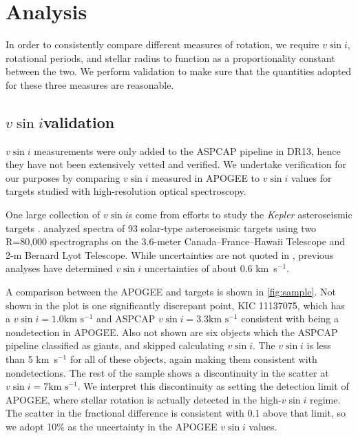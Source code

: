 \documentclass[manuscript]{aastex6}
\newcommand{\vsini}{\ensuremath{v \sin i}}
\newcommand{\Kepler}{\mbox{\textit{Kepler}}}
\newcommand{\kms}{\textrm{km~s}\ensuremath{^{-1}}}
\begin{document}
\section{Analysis}
\label{sec:analysis}

In order to consistently compare different measures of rotation, we require 
\vsini{}, rotational periods, and stellar radius to function as a 
proportionality constant
between the two. We perform validation to make sure that the quantities adopted
for these three measures are reasonable.


\subsection{\vsini validation}

\vsini{} measurements were only added to the ASPCAP pipeline in DR13, hence
they have not been extensively vetted and verified. We undertake 
verification for our purposes by comparing \vsini{} measured in APOGEE to \vsini{} values for
targets studied with high-resolution optical spectroscopy. 

One large collection of \vsini{}s come from efforts to study the
\Kepler{} asteroseismic targets \citep{Bruntt12}. \citet{Bruntt12} analyzed 
spectra of 93 solar-type asteroseismic targets using two R=80,000 spectrographs 
on the 3.6-meter Canada--France--Hawaii Telescope and 2-m Bernard Lyot
Telescope. While uncertainties are not quoted in \citet{Bruntt12},
previous analyses have determined \vsini{} uncertainties of about 0.6
\kms \citep{Bruntt10a,Bruntt10b}.

A comparison between the APOGEE and \citet{Bruntt12} targets is shown in
\cref{fig:sample}. Not shown in the plot is one significantly discrepant point, 
KIC 11137075, which has a \citet{Bruntt12}
\(\vsini = 1.0 \kms\) and ASPCAP \(\vsini = 3.3 \kms\) consistent with being a
nondetection in APOGEE. Also not shown are six
objects which the ASPCAP pipeline classified as giants, and skipped calculating
\vsini{}. The \citet{Bruntt12} \vsini{} is less than 5
\kms{} for all of these objects, again making them consistent with nondetections.
The rest of the sample shows a discontinuity in the scatter at \citet{Bruntt12} 
\(\vsini=7\kms\). We interpret this discontinuity as setting the detection limit 
of APOGEE, where stellar rotation is actually detected in the high-\vsini{} 
regime.  The scatter in the fractional difference is consistent with 0.1 above that
limit, so we adopt 10\% as the uncertainty in the APOGEE \vsini{} values.
\end{document}
